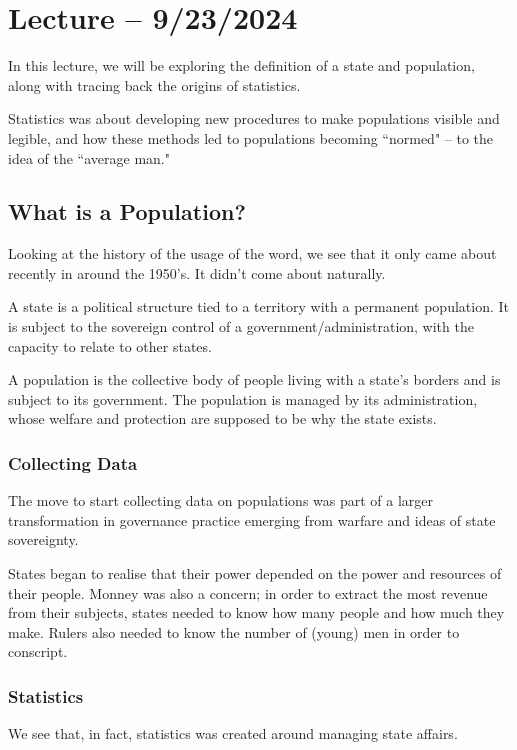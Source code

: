 \documentclass[openany]{book}
\begin{document}
\section{Lecture -- 9/23/2024}
In this lecture, we will be exploring the definition of a state and population, along with tracing back the origins of statistics.

Statistics was about developing new procedures to make populations visible and legible, and how these methods led to populations becoming ``normed" -- to the idea of the ``average man."

\subsection{What is a Population?}
Looking at the history of the usage of the word, we see that it only came about recently in around the 1950's. It didn't come about naturally.

\begin{defn}[State]
	A state is a political structure tied to a territory with a permanent population. It is subject to the sovereign control of a government/administration, with the capacity to relate to other states.
\end{defn}

\begin{defn}[Population]
	A population is the collective body of people living with a state's borders and is subject to its government. The population is managed by its administration, whose welfare and protection are supposed to be why the state exists.
\end{defn}

\subsubsection{Collecting Data}
The move to start collecting data on populations was part of a larger transformation in governance practice emerging from warfare and ideas of state sovereignty.

States began to realise that their power depended on the power and resources of their people. Monney was also a concern; in order to extract the most revenue from their subjects, states needed to know how many people and how much they make. Rulers also needed to know the number of (young) men in order to conscript.

\subsubsection{Statistics}
We see that, in fact, statistics was created around managing state affairs.
\end{document}
